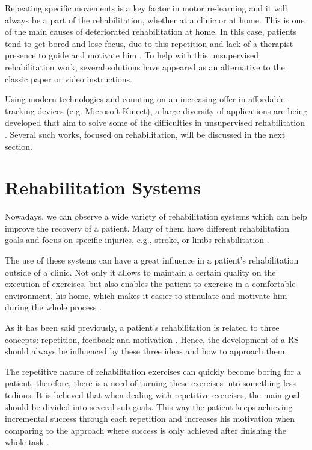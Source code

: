 Repeating specific movements is a key factor in motor re-learning \cite{Schonauer2011a} and it 
will always be a part of the rehabilitation, whether at a clinic or at home.
This is one of the main causes of deteriorated rehabilitation at home. In this case, patients tend to get bored and lose focus, 
due to this repetition and lack of a therapist presence to guide and motivate him \cite{Singh2014a,Balaam2011a,Rego2010}. 
To help with this unsupervised rehabilitation work, several solutions have appeared as 
an alternative to the classic paper or video instructions. 

Using modern technologies and counting on an increasing offer in 
affordable tracking devices (e.g. Microsoft Kinect), a large
diversity of applications are being developed that aim to solve 
some of the difficulties in unsupervised rehabilitation \cite{Kitsunezaki2013,Borghese2013}. Several such works, focused on rehabilitation, will be discussed in the next section.


\section{Rehabilitation Systems}

Nowadays, we can observe a wide variety of rehabilitation systems which can help improve the recovery of a patient. 
Many of them have different rehabilitation goals and focus on specific injuries, e.g., stroke\cite{Borghese2013,Design2005}, 
or limbs rehabilitation \cite{Sadihov2013,Burke2009,Klein2013}.

The use of these systems can have a great influence in a patient's rehabilitation outside of a clinic. 
Not only it allows to maintain a certain quality on the execution of exercises, but also enables 
the patient to exercise in a comfortable environment, his home, which makes it easier to stimulate 
and motivate him during the whole process \cite{Borghese2013}.

As it has been said previously, a patient's rehabilitation is related to three concepts: repetition, feedback and motivation \cite{Schonauer2011a}. 
Hence, the development of a \ac{RS} should always be influenced by these three ideas and how to approach them. 

The repetitive nature of rehabilitation exercises can quickly become boring for a patient\cite{Rego2010,Burke2009,Burdea2002}, 
therefore, there is a need of turning these exercises into something less tedious. 
It is believed that when dealing with repetitive exercises, the main goal should be divided into several sub-goals. This way the 
patient keeps achieving incremental success through each repetition and increases his motivation when comparing to the approach where success is only achieved after finishing the whole task \cite{Schonauer2011a}.

